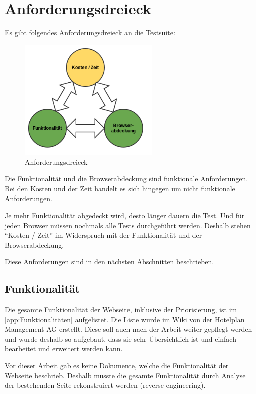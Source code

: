 \section{Anforderungsdreieck}
Es gibt folgendes Anforderungsdreieck an die Testsuite:
\begin{figure}[H]
	\centering
	\includegraphics[width=0.6\textwidth]{images/triangle.png}
	\caption{Anforderungsdreieck}
	\label{fig:analyse:Anforderungsdreieck}
\end{figure}
Die Funktionalität und die Browserabdeckung sind funktionale Anforderungen. Bei den Kosten und der Zeit handelt es sich hingegen um nicht funktionale Anforderungen.

Je mehr Funktionalität abgedeckt wird, desto länger dauern die Test. Und für jeden Browser müssen nochmals alle Tests durchgeführt werden. Deshalb stehen "`Kosten / Zeit"' im Widerspruch mit der Funktionalität und der Browserabdeckung.

Diese Anforderungen sind in den nächsten Abschnitten beschrieben.

\subsection{Funktionalität}
\label{sec:analyse:Funktionalität}
Die gesamte Funktionalität der Webseite, inklusive der Priorisierung, ist im \cref{app:Funktionalitäten}  aufgelistet. Die Liste wurde im Wiki von der Hotelplan Management AG erstellt. Diese soll auch nach der Arbeit weiter gepflegt werden und wurde deshalb so aufgebaut, dass sie sehr Übersichtlich ist und einfach bearbeitet und erweitert werden kann.

Vor dieser Arbeit gab es keine Dokumente, welche die Funktionalität der Webseite beschrieb. Deshalb musste die gesamte Funktionalität durch Analyse der bestehenden Seite rekonstruiert werden (reverse engineering).

